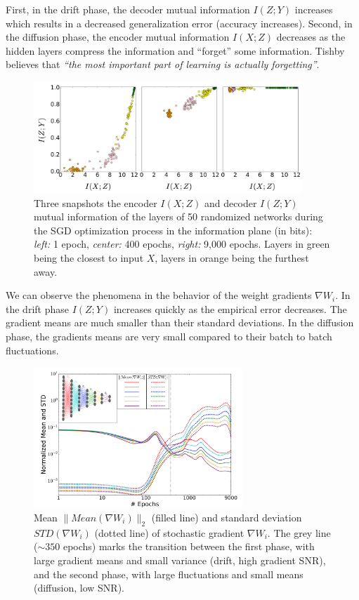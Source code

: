 \documentclass[11pt]{article}
\begin{document}
First, in the drift phase, the decoder mutual information $I(Z;Y)$ increases which results in a decreased generalization error (accuracy increases). Second, in the diffusion phase, the encoder mutual information $I(X;Z)$ decreases as the hidden layers compress the information and ``forget'' some information. Tishby believes that \emph{``the most important part of learning is actually forgetting''}.

\begin{figure}[H]
\centering
\includegraphics[width=0.9\textwidth]{plane}
\caption{Three snapshots the encoder $I(X;Z)$ and decoder $I(Z;Y)$ mutual information of the layers of 50 randomized networks during the SGD optimization process in the information plane (in bits): \emph{left:} 1 epoch, \emph{center:} 400 epochs, \emph{right:} 9,000 epochs. Layers in green being the closest to input $X$, layers in orange being the furthest away. }
\end{figure}

We can observe the phenomena in the behavior of the weight gradients $\nabla W_i$. In the drift phase $I(Z;Y)$ increases quickly as the empirical error decreases. The gradient means are much smaller than their standard deviations. In the diffusion phase, the gradients means are very small compared to their batch to batch fluctuations.

\begin{figure}[H]
	\centering
	\includegraphics[width=0.7\textwidth]{gradient}
	\caption{Mean $\rVert Mean(\nabla W_i)\rVert_2$ (filled line) and standard deviation $STD(\nabla W_i)$ (dotted line) of stochastic gradient $\nabla W_i$. The grey line ($\sim350$ epochs) marks the transition between the first phase, with large gradient means and small variance (drift, high gradient SNR), and the second phase, with large fluctuations and small means (diffusion, low SNR).}
\end{figure}
\end{document}
